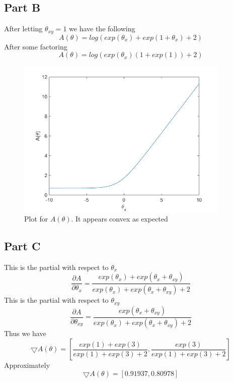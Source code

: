 \documentclass[twoside,11pt]{article}
\theoremstyle{definition}
\begin{document}
\subsection*{Part B}
After letting $\theta_{xy} = 1$ we have the following
\[
A(\theta) = log( exp(\theta_x) + exp(1 + \theta_x) + 2 )
\]
After some factoring
\[
A(\theta) = log( exp(\theta_x)(1 + exp(1) ) + 2 )
\]
\begin{figure}[h]
\centering
\includegraphics[width=4in]{prob3bplot.png}
\caption{Plot for $A(\theta)$. It appears convex as expected}
\end{figure}

\subsection*{Part C}
This is the partial with respect to $\theta_x$
\[
\frac{\partial A}{\partial \theta_x} = \frac{exp(\theta_x) + exp(\theta_x + \theta_{xy})}{exp(\theta_x) + exp(\theta_x + \theta_{xy}) + 2}
\]
This is the partial with respect to $\theta_{xy}$
\[
\frac{\partial A}{\partial \theta_{xy}} = \frac{exp(\theta_x + \theta_{xy})}{exp(\theta_x) + exp(\theta_x + \theta_{xy}) + 2}
\]
Thus we have 
\[
\bigtriangledown A(\theta) = [\frac{exp(1)+exp(3)}{exp(1)+exp(3)+2},\frac{exp(3)}{exp(1)+exp(3)+2}]
\]
Approximately 
\[
\bigtriangledown A(\theta) = [0.91937,0.80978]
\]
\end{document}
